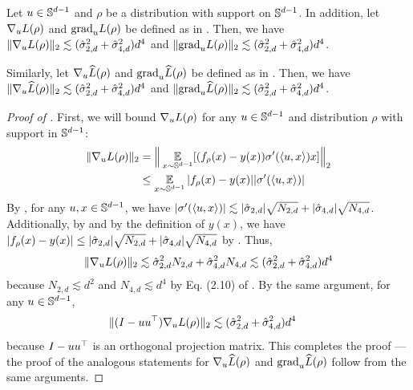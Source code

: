 \begin{lemma}  \label{lemma:gradient_bounds}
Let $u \in \mathbb{S}^{d - 1}$ and $\rho$ be a distribution with support on $\mathbb{S}^{d - 1}$. In addition, let $\nabla_u L(\rho)$ and ${\textup{grad}}_u L(\rho)$ be defined as in . Then, we have $\|\nabla_u L(\rho)\|_2 \lesssim (\hat{\sigma}_{2, d}^2 + \hat{\sigma}_{4, d}^2) d^4$ and $\|{\textup{grad}}_u L(\rho)\|_2 \lesssim (\hat{\sigma}_{2, d}^2 + \hat{\sigma}_{4, d}^2) d^4$.

Similarly, let $\nabla_u \widehat{L}(\rho)$ and ${\textup{grad}}_u \widehat{L}(\rho)$ be defined as in . Then, we have $\|\nabla_u \widehat{L}(\rho)\|_2 \lesssim (\hat{\sigma}_{2, d}^2 + \hat{\sigma}_{4, d}^2) d^4$ and $\|{\textup{grad}}_u \widehat{L}(\rho)\|_2 \lesssim (\hat{\sigma}_{2, d}^2 + \hat{\sigma}_{4, d}^2) d^4$.
\end{lemma}
\begin{proof}[Proof of ]
First, we will bound $\nabla_u L(\rho)$ for any $u \in \mathbb{S}^{d - 1}$ and distribution $\rho$ with support in $\mathbb{S}^{d - 1}$:
\begin{align}
\|\nabla_u L(\rho) \|_2
& = \Big\| \operatorname*{\mathbb{E}}_{x \sim \mathbb{S}^{d - 1}} [(f_\rho(x) - y(x)) \sigma'(\langle u, x \rangle) x] \Big\|_2 \\
& \leq \operatorname*{\mathbb{E}}_{x \sim \mathbb{S}^{d - 1}} |f_\rho(x) - y(x)| |\sigma'(\langle u, x \rangle)|
\end{align}
By , for any $u, x \in \mathbb{S}^{d - 1}$, we have $|\sigma'(\langle u, x \rangle)| \lesssim |\hat{\sigma}_{2, d}| \sqrt{N_{2, d}} + |\hat{\sigma}_{4, d}| \sqrt{N_{4, d}}$. Additionally, by  and by the definition of $y(x)$, we have $|f_\rho(x) - y(x)| \leq |\hat{\sigma}_{2, d}| \sqrt{N_{2, d}} + |\hat{\sigma}_{4, d}| \sqrt{N_{4, d}}$ by . Thus,
\begin{align}
\| \nabla_u L(\rho) \|_2
\lesssim \hat{\sigma}_{2, d}^2 N_{2, d} + \hat{\sigma}_{4, d}^2 N_{4, d}
\lesssim (\hat{\sigma}_{2, d}^2 + \hat{\sigma}_{4, d}^2) d^4
\end{align}
because $N_{2, d} \lesssim d^2$ and $N_{4, d} \lesssim d^4$ by Eq. (2.10) of \citet{atkinson2012spherical}. By the same argument, for any $u \in \mathbb{S}^{d - 1}$,
\begin{align}
\|(I - uu^\top) \nabla_u L(\rho)\|_2
& \lesssim (\hat{\sigma}_{2, d}^2 + \hat{\sigma}_{4, d}^2) d^4
\end{align}
because $I - uu^\top$ is an orthogonal projection matrix. This completes the proof --- the proof of the analogous statements for $\nabla_u \widehat{L}(\rho)$ and ${\textup{grad}}_u \widehat{L}(\rho)$ follow from the same arguments.
\end{proof}

